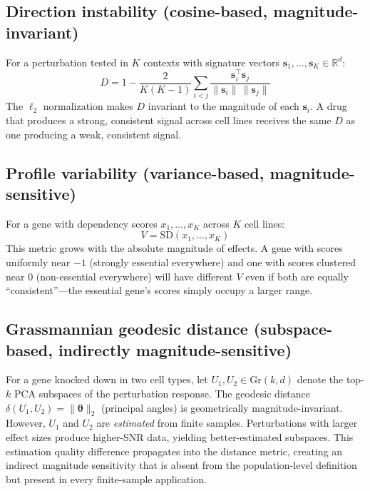 \documentclass[11pt]{article}
\begin{document}
\subsection{Direction instability (cosine-based, magnitude-invariant)}

For a perturbation tested in $K$ contexts with signature vectors
$\mathbf{s}_1, \ldots, \mathbf{s}_K \in \mathbb{R}^d$:
\begin{equation}
  D = 1 - \frac{2}{K(K-1)} \sum_{i < j}
    \frac{\mathbf{s}_i^\top \mathbf{s}_j}
         {\|\mathbf{s}_i\| \, \|\mathbf{s}_j\|}
\end{equation}
The $\ell_2$ normalization makes $D$ invariant to the magnitude of each
$\mathbf{s}_i$. A drug that produces a strong, consistent signal across
cell lines receives the same $D$ as one producing a weak, consistent
signal.

\subsection{Profile variability (variance-based, magnitude-sensitive)}

For a gene with dependency scores $x_1, \ldots, x_K$ across $K$ cell
lines:
\begin{equation}
  V = \text{SD}(x_1, \ldots, x_K)
\end{equation}
This metric grows with the absolute magnitude of effects. A gene with
scores uniformly near $-1$ (strongly essential everywhere) and one with
scores clustered near $0$ (non-essential everywhere) will have different
$V$ even if both are equally ``consistent''---the essential gene's
scores simply occupy a larger range.

\subsection{Grassmannian geodesic distance (subspace-based, indirectly magnitude-sensitive)}

For a gene knocked down in two cell types, let $U_1, U_2 \in
\text{Gr}(k, d)$ denote the top-$k$ PCA subspaces of the perturbation
response. The geodesic distance $\delta(U_1, U_2) =
\|\boldsymbol{\theta}\|_2$ (principal angles) is geometrically
magnitude-invariant. However, $U_1$ and $U_2$ are \emph{estimated} from
finite samples. Perturbations with larger effect sizes produce
higher-SNR data, yielding better-estimated subspaces. This estimation
quality difference propagates into the distance metric, creating an
indirect magnitude sensitivity that is absent from the population-level
definition but present in every finite-sample application.
\end{document}
